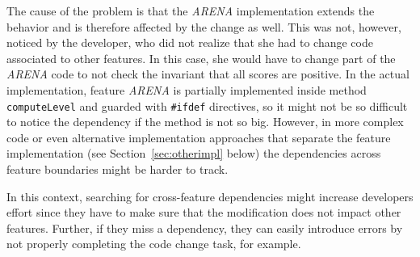 The cause of the problem is that the \emph{ARENA} implementation extends the behavior and is therefore affected by the change as well. This was not, however, noticed by the developer, who did not realize that she had to change code associated to other features. In this case, she would have to change part of the \emph{ARENA} code to not check the invariant that all scores are positive. In the actual implementation, feature \emph{ARENA} is partially implemented inside method \texttt{computeLevel} and guarded with \texttt{\#ifdef} directives, so it might not be so difficult to notice the dependency if the method is not so big. 
However, in more complex code or even alternative implementation approaches that separate the feature implementation (see Section~\ref{sec:otherimpl} below) the dependencies across feature boundaries might be harder to track.

In this context, searching for cross-feature dependencies might increase developers effort since they have to make sure that the modification does not impact other features. Further, if they miss a dependency, they can easily introduce errors by not properly completing the code change task, for example.



